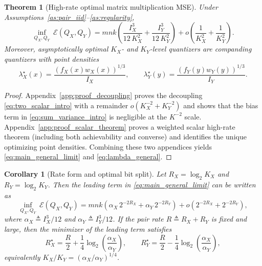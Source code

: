 \documentclass{article}
\newtheorem{theorem}{Theorem}
\newtheorem{corollary}{Corollary}
\newcommand{\R}{\mathbb{R}}
\newcommand{\dd}{\,\mathrm{d}}
\newcommand{\defeq}{\triangleq}
\newcommand{\logtwo}{\log_2}
\begin{document}
\begin{theorem}[High-rate optimal matrix multiplication MSE]\label{thm:main_general}
Under Assumptions~\ref{as:pair_iid}--\ref{as:regularity},
\begin{equation}\label{eq:main_general_limit}
\inf_{Q_X,Q_Y}\ \mathcal{E}(Q_X,Q_Y)
=
mnk\left(\frac{I_X^3}{12\,K_X^2}+\frac{I_Y^3}{12\,K_Y^2}\right)
+ o\!\left(\frac{1}{K_X^2}+\frac{1}{K_Y^2}\right).
\end{equation}
Moreover, asymptotically optimal $K_X$- and $K_Y$-level quantizers are companding quantizers
with point densities
\begin{equation}\label{eq:lambda_general}
\lambda_X^\star(x)=\frac{(f_X(x)w_X(x))^{1/3}}{I_X},\qquad
\lambda_Y^\star(y)=\frac{(f_Y(y)w_Y(y))^{1/3}}{I_Y}.
\end{equation}
\end{theorem}

\begin{proof}
Appendix~\ref{app:proof_decoupling} proves the decoupling \eqref{eq:two_scalar_intro} with a remainder $o(K_X^{-2}+K_Y^{-2})$ and shows that the bias term in \eqref{eq:sum_variance_intro} is negligible at the $K^{-2}$ scale.
Appendix~\ref{app:proof_scalar_theorem} proves a weighted scalar high-rate theorem (including both achievability and converse) and identifies the unique optimizing point densities.
Combining these two appendices yields \eqref{eq:main_general_limit} and \eqref{eq:lambda_general}.
\end{proof}

\begin{corollary}[Rate form and optimal bit split]\label{cor:bit_split}
Let $R_X=\logtwo K_X$ and $R_Y=\logtwo K_Y$. Then the leading term in \eqref{eq:main_general_limit} can be written as
\[
\inf_{Q_X,Q_Y}\ \mathcal{E}(Q_X,Q_Y)
=
mnk\left(\alpha_X\,2^{-2R_X}+\alpha_Y\,2^{-2R_Y}\right)+o(2^{-2R_X}+2^{-2R_Y}),
\]
where $\alpha_X\defeq I_X^3/12$ and $\alpha_Y\defeq I_Y^3/12$.
If the \emph{pair rate} $R\defeq R_X+R_Y$ is fixed and large, then the minimizer of the leading term satisfies
\[
R_X^\star=\frac{R}{2}+\frac{1}{4}\logtwo\!\left(\frac{\alpha_X}{\alpha_Y}\right),\qquad
R_Y^\star=\frac{R}{2}-\frac{1}{4}\logtwo\!\left(\frac{\alpha_X}{\alpha_Y}\right),
\]
equivalently $K_X/K_Y=(\alpha_X/\alpha_Y)^{1/4}$.
\end{corollary}

\end{document}
